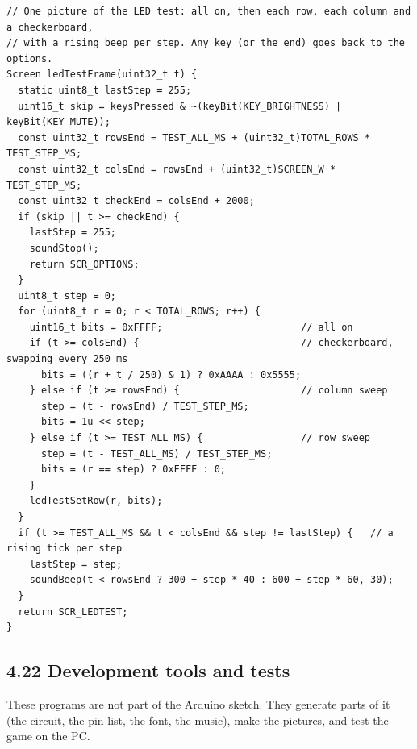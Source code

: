 \documentclass[11pt,a4paper]{article}
\begin{document}
\begin{lstlisting}[language=Arduino]
// One picture of the LED test: all on, then each row, each column and a checkerboard,
// with a rising beep per step. Any key (or the end) goes back to the options.
Screen ledTestFrame(uint32_t t) {
  static uint8_t lastStep = 255;
  uint16_t skip = keysPressed & ~(keyBit(KEY_BRIGHTNESS) | keyBit(KEY_MUTE));
  const uint32_t rowsEnd = TEST_ALL_MS + (uint32_t)TOTAL_ROWS * TEST_STEP_MS;
  const uint32_t colsEnd = rowsEnd + (uint32_t)SCREEN_W * TEST_STEP_MS;
  const uint32_t checkEnd = colsEnd + 2000;
  if (skip || t >= checkEnd) {
    lastStep = 255;
    soundStop();
    return SCR_OPTIONS;
  }
  uint8_t step = 0;
  for (uint8_t r = 0; r < TOTAL_ROWS; r++) {
    uint16_t bits = 0xFFFF;                        // all on
    if (t >= colsEnd) {                            // checkerboard, swapping every 250 ms
      bits = ((r + t / 250) & 1) ? 0xAAAA : 0x5555;
    } else if (t >= rowsEnd) {                     // column sweep
      step = (t - rowsEnd) / TEST_STEP_MS;
      bits = 1u << step;
    } else if (t >= TEST_ALL_MS) {                 // row sweep
      step = (t - TEST_ALL_MS) / TEST_STEP_MS;
      bits = (r == step) ? 0xFFFF : 0;
    }
    ledTestSetRow(r, bits);
  }
  if (t >= TEST_ALL_MS && t < colsEnd && step != lastStep) {   // a rising tick per step
    lastStep = step;
    soundBeep(t < rowsEnd ? 300 + step * 40 : 600 + step * 60, 30);
  }
  return SCR_LEDTEST;
}
\end{lstlisting}

\clearpage
\subsection*{4.22 Development tools and tests}
These programs are not part of the Arduino sketch. They generate parts of it (the circuit, the pin list, the font, the music), make the pictures, and test the game on the PC.
\end{document}
